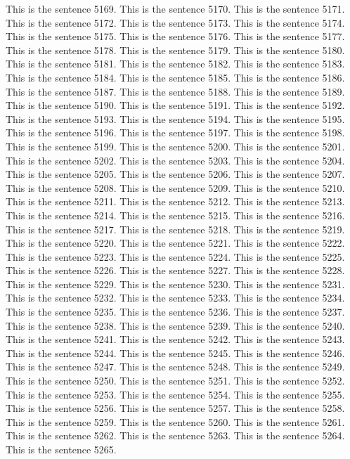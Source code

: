 \documentclass{article}
\begin{document}
This is the sentence 5169.
This is the sentence 5170.
This is the sentence 5171.
This is the sentence 5172.
This is the sentence 5173.
This is the sentence 5174.
This is the sentence 5175.
This is the sentence 5176.
This is the sentence 5177.
This is the sentence 5178.
This is the sentence 5179.
This is the sentence 5180.
This is the sentence 5181.
This is the sentence 5182.
This is the sentence 5183.
This is the sentence 5184.
This is the sentence 5185.
This is the sentence 5186.
This is the sentence 5187.
This is the sentence 5188.
This is the sentence 5189.
This is the sentence 5190.
This is the sentence 5191.
This is the sentence 5192.
This is the sentence 5193.
This is the sentence 5194.
This is the sentence 5195.
This is the sentence 5196.
This is the sentence 5197.
This is the sentence 5198.
This is the sentence 5199.
This is the sentence 5200.
This is the sentence 5201.
This is the sentence 5202.
This is the sentence 5203.
This is the sentence 5204.
This is the sentence 5205.
This is the sentence 5206.
This is the sentence 5207.
This is the sentence 5208.
This is the sentence 5209.
This is the sentence 5210.
This is the sentence 5211.
This is the sentence 5212.
This is the sentence 5213.
This is the sentence 5214.
This is the sentence 5215.
This is the sentence 5216.
This is the sentence 5217.
This is the sentence 5218.
This is the sentence 5219.
This is the sentence 5220.
This is the sentence 5221.
This is the sentence 5222.
This is the sentence 5223.
This is the sentence 5224.
This is the sentence 5225.
This is the sentence 5226.
This is the sentence 5227.
This is the sentence 5228.
This is the sentence 5229.
This is the sentence 5230.
This is the sentence 5231.
This is the sentence 5232.
This is the sentence 5233.
This is the sentence 5234.
This is the sentence 5235.
This is the sentence 5236.
This is the sentence 5237.
This is the sentence 5238.
This is the sentence 5239.
This is the sentence 5240.
This is the sentence 5241.
This is the sentence 5242.
This is the sentence 5243.
This is the sentence 5244.
This is the sentence 5245.
This is the sentence 5246.
This is the sentence 5247.
This is the sentence 5248.
This is the sentence 5249.
This is the sentence 5250.
This is the sentence 5251.
This is the sentence 5252.
This is the sentence 5253.
This is the sentence 5254.
This is the sentence 5255.
This is the sentence 5256.
This is the sentence 5257.
This is the sentence 5258.
This is the sentence 5259.
This is the sentence 5260.
This is the sentence 5261.
This is the sentence 5262.
This is the sentence 5263.
This is the sentence 5264.
This is the sentence 5265.
\end{document}
